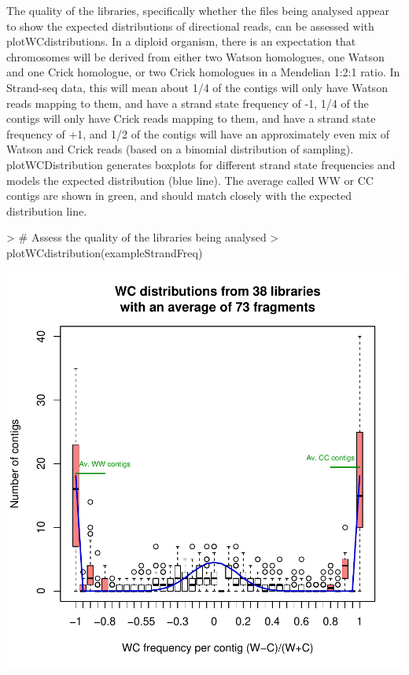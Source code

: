 \documentclass{article}
\begin{document}
The quality of the libraries, specifically whether the files being analysed appear to show the expected distributions of directional reads, can be assessed with plotWCdistributions.  In a diploid organism, there is an expectation that chromosomes will be derived from either two Watson homologues, one Watson and one Crick homologue, or two Crick homologues in a Mendelian 1:2:1 ratio.  In Strand-seq data, this will mean about 1/4 of the contigs will only have Watson reads mapping to them, and have a strand state frequency of -1, 1/4 of the contigs will only have Crick reads mapping to them, and have a strand state frequency of +1, and 1/2 of the contigs will have an approximately even mix of Watson and Crick reads (based on a binomial distribution of sampling).  plotWCDistribution generates boxplots for different strand state frequencies and models the expected distribution (blue line). The average called WW or CC contigs are shown in green, and should match closely with the expected distribution line.

\begin{Schunk}
\begin{Sinput}
> # Assess the quality of the libraries being analysed
> plotWCdistribution(exampleStrandFreq)
\end{Sinput}
\end{Schunk}
\includegraphics{contiBAIT-strandSeqFreqTableExamplec}
\end{document}

